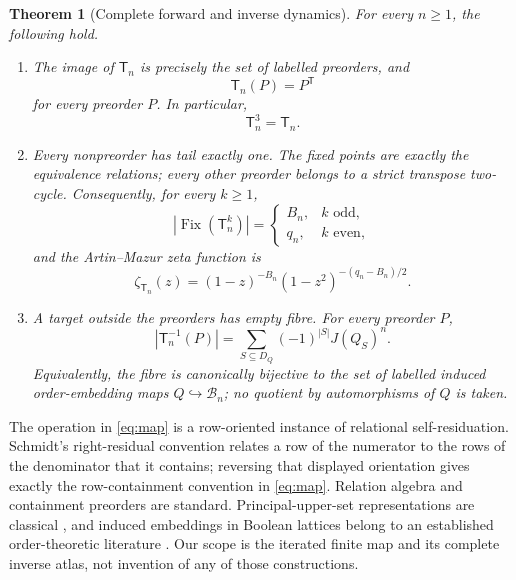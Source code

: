 \documentclass[10pt,a4paper]{amsart}
\newtheorem{theorem}{Theorem}[section]
\theoremstyle{definition}
\theoremstyle{remark}
\newcommand{\B}{\mathcal B}
\newcommand{\Fix}{\operatorname{Fix}}
\newcommand{\T}{\mathsf T}
\begin{document}
\begin{theorem}[Complete forward and inverse dynamics]\label{thm:main}
For every $n\geq1$, the following hold.
\begin{enumerate}[label=\textup{(\roman*)}]
\item The image of $\T_n$ is precisely the set of labelled preorders, and
\begin{equation}\label{eq:transpose}
                       \T_n(P)=P^{\mathsf T}
\end{equation}
for every preorder $P$.  In particular,
\begin{equation}\label{eq:T3}
                             \T_n^3=\T_n.
\end{equation}
\item Every nonpreorder has tail exactly one.  The fixed points are exactly
the equivalence relations; every other preorder belongs to a strict
transpose two-cycle.  Consequently, for every $k\geq1$,
\begin{equation}\label{eq:fixed-iterates}
 |\Fix(\T_n^k)|=
 \begin{cases}
 B_n,&k\text{ odd},\\
 q_n,&k\text{ even},
 \end{cases}
\end{equation}
and the Artin--Mazur zeta function is
\begin{equation}\label{eq:zeta}
 \zeta_{\T_n}(z)
 =(1-z)^{-B_n}(1-z^2)^{-(q_n-B_n)/2}.
\end{equation}
\item A target outside the preorders has empty fibre.  For every preorder
$P$,
\begin{equation}\label{eq:fibre}
 |\T_n^{-1}(P)|
 =\sum_{S\subseteq D_Q}(-1)^{|S|}J(Q_S)^n.
\end{equation}
Equivalently, the fibre is canonically bijective to the set of labelled
induced order-embedding maps $Q\hookrightarrow\B_n$; no quotient by
automorphisms of $Q$ is taken.
\end{enumerate}
\end{theorem}

The operation in \eqref{eq:map} is a row-oriented instance of relational
self-residuation.  Schmidt's \cite[\S4.4, especially Fig.~4.4.2,
p.~45]{Schmidt2011} right-residual convention relates a row of the numerator
to the rows of the denominator that it contains; reversing that displayed
orientation gives exactly the row-containment convention in \eqref{eq:map}.
Relation algebra and containment preorders are standard.  Principal-upper-set
representations are classical \cite[pp.~525--526]{Botts1954}, and induced
embeddings in Boolean lattices belong to an established order-theoretic
literature \cite{KatonaNagy2015}.  Our scope is the iterated finite map and
its complete inverse atlas, not invention of any of those constructions.
\end{document}
